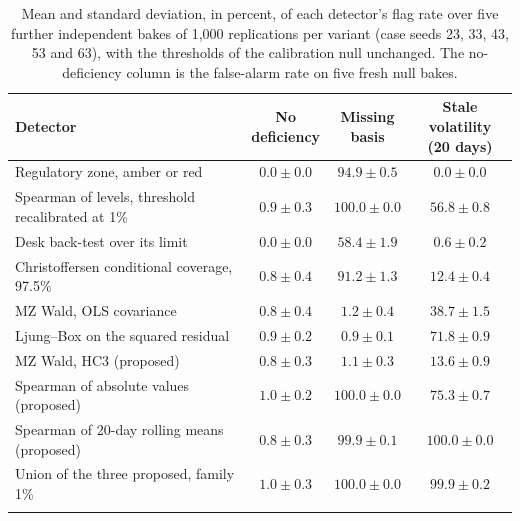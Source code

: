 \begin{table}[htbp]
\centering
\footnotesize
\renewcommand{\arraystretch}{1.1}
\caption{Mean and standard deviation, in percent, of each detector's flag rate over five further independent bakes of 1,000 replications per variant (case seeds 23, 33, 43, 53 and 63), with the thresholds of the calibration null unchanged. The no-deficiency column is the false-alarm rate on five fresh null bakes.}
\label{tab:repeats}
\begin{tabular}{>{\raggedright\arraybackslash}p{5.2cm}ccc}
\toprule
Detector & \shortstack{No\\deficiency} & \shortstack{Missing\\basis} & \shortstack{Stale volatility\\(20 days)} \\
\midrule
Regulatory zone, amber or red & $0.0\pm0.0$ & $94.9\pm0.5$ & $0.0\pm0.0$ \\ \addlinespace[0.8ex]
Spearman of levels, threshold recalibrated at 1\% & $0.9\pm0.3$ & $100.0\pm0.0$ & $56.8\pm0.8$ \\ \addlinespace[0.8ex]
Desk back-test over its limit & $0.0\pm0.0$ & $58.4\pm1.9$ & $0.6\pm0.2$ \\ \addlinespace[0.8ex]
Christoffersen conditional coverage, 97.5\% & $0.8\pm0.4$ & $91.2\pm1.3$ & $12.4\pm0.4$ \\ \addlinespace[0.8ex]
MZ Wald, OLS covariance & $0.8\pm0.4$ & $1.2\pm0.4$ & $38.7\pm1.5$ \\ \addlinespace[0.8ex]
Ljung--Box on the squared residual & $0.9\pm0.2$ & $0.9\pm0.1$ & $71.8\pm0.9$ \\ \addlinespace[0.8ex]
MZ Wald, HC3 (proposed) & $0.8\pm0.3$ & $1.1\pm0.3$ & $13.6\pm0.9$ \\ \addlinespace[0.8ex]
Spearman of absolute values (proposed) & $1.0\pm0.2$ & $100.0\pm0.0$ & $75.3\pm0.7$ \\ \addlinespace[0.8ex]
Spearman of 20-day rolling means (proposed) & $0.8\pm0.3$ & $99.9\pm0.1$ & $100.0\pm0.0$ \\ \addlinespace[0.8ex]
Union of the three proposed, family 1\% & $1.0\pm0.3$ & $100.0\pm0.0$ & $99.9\pm0.2$ \\ \addlinespace[0.8ex]
\bottomrule
\end{tabular}

\vspace{1.5ex}


\end{table}
